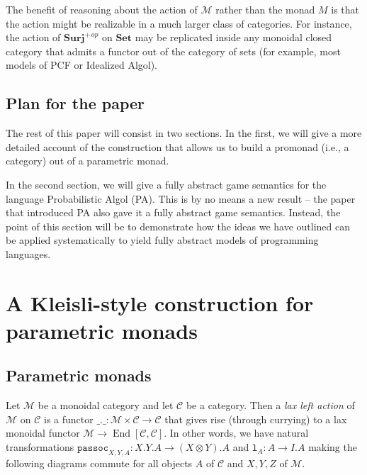 \documentclass{svproc}
\newcommand\C{\mathcal{C}}
\newcommand\M{\mathcal{M}}
\DeclareMathOperator{\End}{End}
\newcommand{\passoc}{\texttt{passoc}}
\newcommand\tensor\otimes
\newcommand\lun{\texttt{l}}
\newcommand*\from{\colon}
\newcommand{\0}{{\mathtt{0}}} \newcommand{\com}{{\mathtt{com}}}
\newcommand{\catname}[1]{\mathbf{#1}}
\newcommand{\Set}{\catname{Set}}
\newcommand{\Surj}{\catname{Surj}}
\begin{document}
The benefit of reasoning about the action of $\M$ rather than the monad $M$ is that the action might be realizable in a much larger class of categories.  
For instance, the action of $\Surj^{+\,op}$ on $\Set$ may be replicated inside any monoidal closed category that admits a functor out of the category of sets (for example, most models of PCF or Idealized Algol).

\subsection{Plan for the paper}

The rest of this paper will consist in two sections.  
In the first, we will give a more detailed account of the construction that allows us to build a promonad (i.e., a category) out of a parametric monad.  

In the second section, we will give a fully abstract game semantics for the language Probabilistic Algol (PA).  
This is by no means a new result -- the paper \cite{DanosHarmer} that introduced PA also gave it a fully abstract game semantics.  
Instead, the point of this section will be to demonstrate how the ideas we have outlined can be applied systematically to yield fully abstract models of programming languages.

\section{A Kleisli-style construction for parametric monads}

\subsection{Parametric monads}

Let $\M$ be a monoidal category and let $\C$ be a category.  
Then a \emph{lax left action} of $\M$ on $\C$ is a functor $\_.\_\from \M\times\C\to \C$ that gives rise (through currying) to a lax monoidal functor $\M\to \End[\C,\C]$.  
In other words, we have natural transformations $\passoc_{X,Y,A}\from X.Y.A\to (X\tensor Y).A$ and $\lun_A\from A \to I.A$ making the following diagrams commute for all objects $A$ of $\C$ and $X,Y,Z$ of $\M$.
\end{document}
